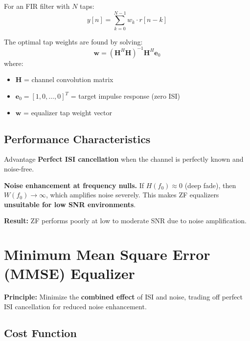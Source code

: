 For an FIR filter with $N$ taps:
\begin{equation}
y[n] = \sum_{k=0}^{N-1} w_k \cdot r[n-k]
\label{eq:zf-time}
\end{equation}

The optimal tap weights are found by solving:
\begin{equation}
\mathbf{w} = (\mathbf{H}^H \mathbf{H})^{-1} \mathbf{H}^H \mathbf{e}_0
\label{eq:zf-taps}
\end{equation}
where:
\begin{itemize}
\item $\mathbf{H}$ = channel convolution matrix
\item $\mathbf{e}_0 = [1, 0, \ldots, 0]^T$ = target impulse response (zero ISI)
\item $\mathbf{w}$ = equalizer tap weight vector
\end{itemize}

\subsection{Performance Characteristics}

\begin{calloutbox}[colback=green!5!white,colframe=green!60!black]{Advantage}
\textbf{Perfect ISI cancellation} when the channel is perfectly known and noise-free.
\end{calloutbox}

\begin{warningbox}
\textbf{Noise enhancement at frequency nulls.} If $H(f_0) \approx 0$ (deep fade), then $W(f_0) \rightarrow \infty$, which amplifies noise severely. This makes ZF equalizers \textbf{unsuitable for low SNR environments}.
\end{warningbox}

\textbf{Result:} ZF performs poorly at low to moderate SNR due to noise amplification.

\section{Minimum Mean Square Error (MMSE) Equalizer}
\label{sec:mmse-equalizer}

\textbf{Principle:} Minimize the \textbf{combined effect} of ISI and noise, trading off perfect ISI cancellation for reduced noise enhancement.

\subsection{Cost Function}

